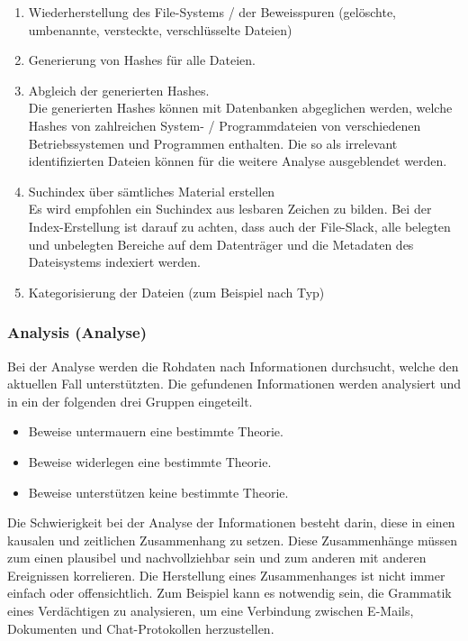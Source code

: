 \begin{enumerate}
\item Wiederherstellung des File-Systems / der Beweisspuren (gelöschte, umbenannte, versteckte, verschlüsselte Dateien)
\item Generierung von Hashes für alle Dateien.
\item Abgleich der generierten Hashes. \\
Die generierten Hashes können mit Datenbanken abgeglichen werden, welche Hashes von zahlreichen System- / Programmdateien von verschiedenen Betriebssystemen und Programmen enthalten. Die so als irrelevant identifizierten Dateien können für die weitere Analyse ausgeblendet werden.
\item Suchindex über sämtliches Material erstellen \\
Es wird empfohlen ein Suchindex aus lesbaren Zeichen zu bilden. Bei der Index-Erstellung ist darauf zu achten, dass auch der File-Slack, alle belegten und unbelegten Bereiche auf dem Datenträger und die Metadaten des Dateisystems indexiert werden.
\item Kategorisierung der Dateien (zum Beispiel nach Typ)
\end{enumerate}



\subsubsection{Analysis (Analyse)}
Bei der Analyse werden die Rohdaten nach Informationen durchsucht, welche den aktuellen Fall unterstützten. Die gefundenen Informationen werden analysiert und in ein der folgenden drei Gruppen eingeteilt.

\begin{itemize}
\item Beweise untermauern eine bestimmte Theorie.
\item Beweise widerlegen eine bestimmte Theorie.
\item Beweise unterstützen keine bestimmte Theorie.
\end{itemize}

Die Schwierigkeit bei der Analyse der Informationen besteht darin, diese in einen kausalen und zeitlichen Zusammenhang zu setzen. Diese Zusammenhänge müssen zum einen plausibel und nachvollziehbar sein und zum anderen mit anderen Ereignissen korrelieren. Die Herstellung eines Zusammenhanges ist nicht immer einfach oder offensichtlich.  Zum Beispiel kann es notwendig sein, die Grammatik eines Verdächtigen zu analysieren, um eine Verbindung zwischen E-Mails, Dokumenten und Chat-Protokollen herzustellen.


